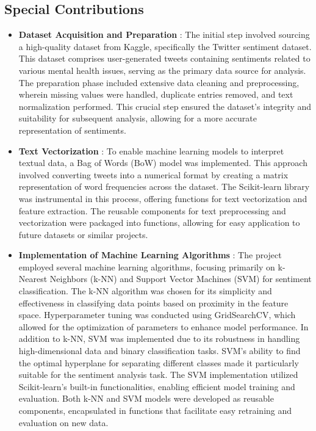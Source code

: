 \subsection{Special Contributions}
\begin{itemize}
    \item \textbf{Dataset Acquisition and Preparation} :
    \noindent
    The initial step involved sourcing a high-quality dataset from Kaggle, specifically the Twitter sentiment dataset. This dataset comprises user-generated tweets containing sentiments related to various mental health issues, serving as the primary data source for analysis. The preparation phase included extensive data cleaning and preprocessing, wherein missing values were handled, duplicate entries removed, and text normalization performed. This crucial step ensured the dataset's integrity and suitability for subsequent analysis, allowing for a more accurate representation of sentiments.
    \item \textbf{Text Vectorization} :
    \noindent
    To enable machine learning models to interpret textual data, a Bag of Words (BoW) model was implemented. This approach involved converting tweets into a numerical format by creating a matrix representation of word frequencies across the dataset. The Scikit-learn library was instrumental in this process, offering functions for text vectorization and feature extraction. The reusable components for text preprocessing and vectorization were packaged into functions, allowing for easy application to future datasets or similar projects.
    \item \textbf{Implementation of Machine Learning Algorithms} :
    \noindent
    The project employed several machine learning algorithms, focusing primarily on k-Nearest Neighbors (k-NN) and Support Vector Machines (SVM) for sentiment classification. The k-NN algorithm was chosen for its simplicity and effectiveness in classifying data points based on proximity in the feature space. Hyperparameter tuning was conducted using GridSearchCV, which allowed for the optimization of parameters to enhance model performance. In addition to k-NN, SVM was implemented due to its robustness in handling high-dimensional data and binary classification tasks. SVM's ability to find the optimal hyperplane for separating different classes made it particularly suitable for the sentiment analysis task. The SVM implementation utilized Scikit-learn’s built-in functionalities, enabling efficient model training and evaluation. Both k-NN and SVM models were developed as reusable components, encapsulated in functions that facilitate easy retraining and evaluation on new data.

\end{itemize}
